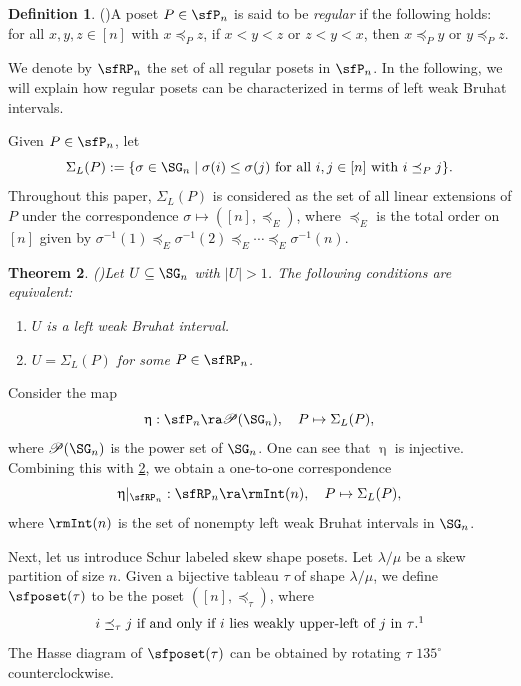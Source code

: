 \documentclass[12pt, reqno]{amsart}
\newtheorem{theorem}{Theorem}[section]
\theoremstyle{definition}
\newtheorem{definition}[theorem]{Definition}
\numberwithin{equation}{section} \numberwithin{figure}{section}
\numberwithin{table}{section}
\begin{document}
\begin{definition}{\rm (\cite[p. 110]{91BW})}\label{def: regular posets}
A poset $P \in \sfP_n$ is said to be \emph{regular} if the following holds:
for all $x,y,z \in [n]$ with
$x \preceq_P z$, if $x < y < z$ or $z<y<x$, then $x \preceq_P y$ or $y \preceq_P z$.
\end{definition}


We denote by $\sfRP_n$ the set of all regular posets in $\sfP_n$.
In the following, we will explain how regular posets can be characterized in terms of left weak Bruhat intervals.




Given $P \in \sfP_n$, 
let
\[
\Sigma_{L}(P) := \{\sigma \in \SG_n \mid \text{$\sigma(i) \leq \sigma(j)$ for all $i, j\in [n]$ with $i \preceq_P j$}\}.
\]
Throughout this paper, $\Sigma_L(P)$ is considered as the set of all linear extensions of $P$ under the correspondence $\sigma \mapsto ([n], \preceq_E)$, where $\preceq_E$ is the total order on $[n]$ given by 
$\sigma^{-1}(1) \preceq_E \sigma^{-1}(2) \preceq_E \cdots \preceq_E \sigma^{-1}(n)$.


\begin{theorem}{\rm (\cite[Theorem 6.8]{91BW})}\label{thm: left interval and regular}
Let $U \subseteq \SG_n$ with $|U| > 1$.
The following conditions are equivalent:
\begin{enumerate}[label = {\rm (\arabic*)}]
    \item $U$ is a left weak Bruhat interval.
    \item $U = \Sigma_L(P)$ for some $P \in \sfRP_n$.
\end{enumerate}  
\end{theorem}
Consider the map
\[
\upeta: \sfP_n \ra \mathscr{P}(\SG_n), \quad P \mapsto \Sigma_L(P),
\]
where $\mathscr{P}(\SG_n)$ is the power set of $\SG_n$.
One can see that $\upeta$ is injective.
Combining this with \cref{thm: left interval and regular}, we obtain a one-to-one correspondence 
\[
\upeta|_{\sfRP_n}: \sfRP_n \ra \rmInt(n), \quad P \mapsto \Sigma_L(P),
\]
where $\rmInt(n)$ is the set of nonempty left weak Bruhat intervals in $\SG_n$.
 






Next, let us introduce Schur labeled skew shape posets.
Let $\lambda / \mu$ be a skew partition of size $n$.
Given a bijective tableau $\tau$ of shape $\lambda/\mu$, we define $\sfposet(\tau)$ to be 
the poset $([n], \preceq_\tau)$, where
\begin{align}\label{eq: order of poset(tau)}
\text{$i \preceq_\tau j$ if and only if  $i$ lies weakly upper-left of $j$ in $\tau$.}
\footnotemark
\end{align}
%
The Hasse diagram of $\sfposet(\tau)$ can be obtained by rotating $\tau$ $135^\circ$ counterclockwise.
\end{document}

